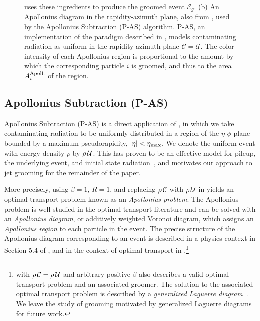 \begin{figure}[t!]
{    %
     uses these ingredients to produce the groomed event \(\mathcal{E}_g\).
    (b) An Apollonius diagram in the rapidity-azimuth plane, also from , used by the Apollonius Subtraction (P-AS) algorithm.
    P-AS, an implementation of the \PIRANHA{} paradigm described in , models contaminating radiation as uniform in the rapidity-azimuth plane \(\mathcal C = \mathcal U\).
    The color intensity of each Apollonius region is proportional to the amount by which the corresponding particle \(i\) is groomed, and thus to the area \(A^{\rm Apoll.}_i\) of the region.
}
\label{fig:as}
\end{figure}



\subsection{Apollonius Subtraction (P-AS)}
\label{sec:as}

Apollonius Subtraction (P-AS) is a direct application of , in which we take contaminating radiation to be uniformly distributed in a region of the \(\eta\)-\(\phi\) plane bounded by a maximum pseudorapidity, \(|\eta| < \eta_{\rm max}\).
%
We denote the uniform event with energy density \(\rho\) by \(\rho\,\mathcal{U}\).
%
This has proven to be an effective model for pileup, the underlying event, and initial state radiation~\cite{Soyez:2018opl,Monk:2018clo,Sjostrand:1987su,Sjostrand:2014zea,Dasgupta:2007wa,Kirchgaesser:2020poq,Moraes:2007rq,CDF:2015txs,Larkoski:2021hee,Baron:2020xoi,Marzani:2017kqd}, and motivates our approach to jet grooming for the remainder of the paper.

More precisely, using \(\beta = 1\), \(R =1\), and replacing \(\rho\,\mathcal{C}\) with \(\rho\,\mathcal{U}\) in  yields an optimal transport problem known as an \textit{Apollonius problem}.
%
The Apollonius problem is well studied in the optimal transport literature and can be solved with an \textit{Apollonius diagram}, or additively weighted Voronoi diagram, which assigns an \textit{Apollonius region} to each particle in the event.
%
The precise structure of the Apollonius diagram corresponding to an event is described in a physics context in Section 5.4 of , and in the context of optimal transport in .\footnote{
 with \(\rho\,\mathcal{C} = \rho\,\mathcal{U}\) and arbitrary positive \(\beta\) also describes a valid optimal transport problem and an associated \PIRANHA{} groomer.
%
The solution to the associated optimal transport problem is described by a \textit{generalized Laguerre diagram}~\cite{Komiske:2020qhg, bourne2018semidiscrete}.
%
We leave the study of \PIRANHA{} grooming motivated by generalized Laguerre diagrams for future work.
}

